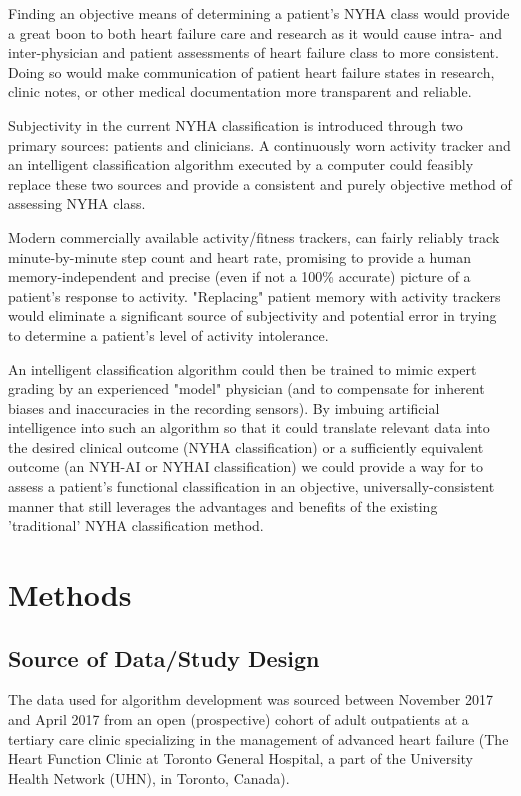 \documentclass[]{article}
\begin{document}
Finding an objective means of determining a patient's NYHA class would provide a great boon to both heart failure care and research as it would cause intra- and inter-physician and patient assessments of heart failure class to more consistent. Doing so would make communication of patient heart failure states in research, clinic notes, or other medical documentation more transparent and reliable.

Subjectivity in the current NYHA classification is introduced through two primary sources: patients and clinicians. A continuously worn activity tracker and an intelligent classification algorithm executed by a computer could feasibly replace these two sources and provide a consistent and purely objective method of assessing NYHA class.

Modern commercially available activity/fitness trackers, can fairly reliably track minute-by-minute step count and heart rate, promising to provide a human memory-independent and precise (even if not a 100\% accurate) picture of a patient's response to activity. "Replacing" patient memory with activity trackers would eliminate a significant source of subjectivity and potential error in trying to determine a patient's level of activity intolerance.

An intelligent classification algorithm could then be trained to mimic expert grading by an experienced "model" physician (and to compensate for inherent biases and inaccuracies in the recording sensors). By imbuing artificial intelligence into such an algorithm so that it could translate relevant data into the desired clinical outcome (NYHA classification) or a sufficiently equivalent outcome (an NYH-AI or NYHAI classification) we could provide a way for to assess a patient's functional classification in an objective, universally-consistent manner that still leverages the advantages and benefits of the existing 'traditional' NYHA classification method.

\section{Methods}
\subsection{Source of Data/Study Design} %

The data used for algorithm development was sourced between November 2017 and April 2017 from an open (prospective) cohort of adult outpatients at a tertiary care clinic specializing in the management of advanced heart failure (The Heart Function Clinic at Toronto General Hospital, a part of the University Health Network (UHN), in Toronto, Canada).
\end{document}
